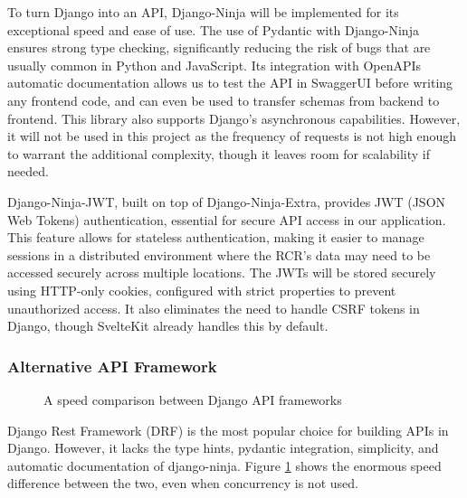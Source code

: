 To turn Django into an API, Django-Ninja will be implemented for its exceptional speed and ease of use. The use of Pydantic with Django-Ninja ensures strong type checking, significantly reducing the risk of bugs that are usually common in Python and JavaScript. Its integration with OpenAPIs automatic documentation allows us to test the API in SwaggerUI before writing any frontend code, and can even be used to transfer schemas from backend to frontend. This library also supports Django's asynchronous capabilities. However, it will not be used in this project as the frequency of requests is not high enough to warrant the additional complexity, though it leaves room for scalability if needed.

Django-Ninja-JWT, built on top of Django-Ninja-Extra, provides JWT (JSON Web Tokens) authentication, essential for secure API access in our application. This feature allows for stateless authentication, making it easier to manage sessions in a distributed environment where the RCR's data may need to be accessed securely across multiple locations. The JWTs will be stored securely using HTTP-only cookies, configured with strict properties to prevent unauthorized access. It also eliminates the need to handle CSRF tokens in Django, though SvelteKit already handles this by default.

\subsubsection{Alternative API Framework}
\begin{figure}[h]
\centering
{}
\vspace{-15pt}
\caption{A speed comparison between Django API frameworks \parencite{vitaliy_kucheryaviy_django_2024}
\label{fig:django-ninja-speed}}
\vspace{-5pt}
\end{figure}
Django Rest Framework (DRF) is the most popular choice for building APIs in Django. However, it lacks the type hints, pydantic integration, simplicity, and automatic documentation of django-ninja. Figure \ref{fig:django-ninja-speed} shows the enormous speed difference between the two, even when concurrency is not used.


